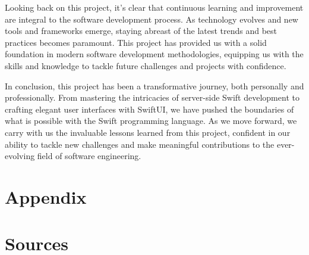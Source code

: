 \documentclass[
  biblatex,
  language=english,
  figures=false,
  sourcecodes,
  glossaries,
  index
]{kidiplom}
\begin{document}
\begin{kiconclusions}
Looking back on this project, it's clear that continuous learning and improvement are integral to the software development process. As technology evolves and new tools and frameworks emerge, staying abreast of the latest trends and best practices becomes paramount. This project has provided us with a solid foundation in modern software development methodologies, equipping us with the skills and knowledge to tackle future challenges and projects with confidence.

In conclusion, this project has been a transformative journey, both personally and professionally. From mastering the intricacies of server-side Swift development to crafting elegant user interfaces with SwiftUI, we have pushed the boundaries of what is possible with the Swift programming language. As we move forward, we carry with us the invaluable lessons learned from this project, confident in our ability to tackle new challenges and make meaningful contributions to the ever-evolving field of software engineering.

\end{kiconclusions}


\appendix

\section{Appendix}

\section{Sources} \label{sec:ObsahData}

\printindex
\end{document}
